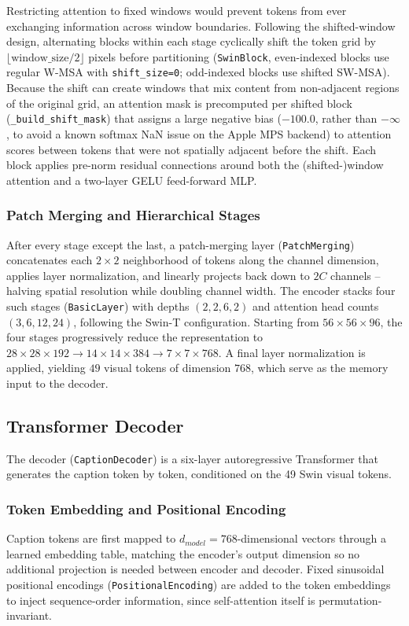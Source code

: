 Restricting attention to fixed windows would prevent tokens from ever exchanging information across window boundaries. Following the shifted-window design, alternating blocks within each stage cyclically shift the token grid by $\lfloor \text{window\_size}/2 \rfloor$ pixels before partitioning (\texttt{SwinBlock}, even-indexed blocks use regular W-MSA with \texttt{shift\_size=0}; odd-indexed blocks use shifted SW-MSA). Because the shift can create windows that mix content from non-adjacent regions of the original grid, an attention mask is precomputed per shifted block (\texttt{\_build\_shift\_mask}) that assigns a large negative bias ($-100.0$, rather than $-\infty$, to avoid a known softmax NaN issue on the Apple MPS backend) to attention scores between tokens that were not spatially adjacent before the shift. Each block applies pre-norm residual connections around both the (shifted-)window attention and a two-layer GELU feed-forward MLP.

\subsubsection{Patch Merging and Hierarchical Stages}
After every stage except the last, a patch-merging layer (\texttt{PatchMerging}) concatenates each $2\times2$ neighborhood of tokens along the channel dimension, applies layer normalization, and linearly projects back down to $2C$ channels -- halving spatial resolution while doubling channel width. The encoder stacks four such stages (\texttt{BasicLayer}) with depths $(2,2,6,2)$ and attention head counts $(3,6,12,24)$, following the Swin-T configuration. Starting from $56\times56\times96$, the four stages progressively reduce the representation to $28\times28\times192 \rightarrow 14\times14\times384 \rightarrow 7\times7\times768$. A final layer normalization is applied, yielding $49$ visual tokens of dimension $768$, which serve as the memory input to the decoder.

\subsection{Transformer Decoder}
\label{sec:method-decoder}

The decoder (\texttt{CaptionDecoder}) is a six-layer autoregressive Transformer that generates the caption token by token, conditioned on the 49 Swin visual tokens.

\subsubsection{Token Embedding and Positional Encoding}
Caption tokens are first mapped to $d_{model}=768$-dimensional vectors through a learned embedding table, matching the encoder's output dimension so no additional projection is needed between encoder and decoder. Fixed sinusoidal positional encodings (\texttt{PositionalEncoding}) are added to the token embeddings to inject sequence-order information, since self-attention itself is permutation-invariant.

